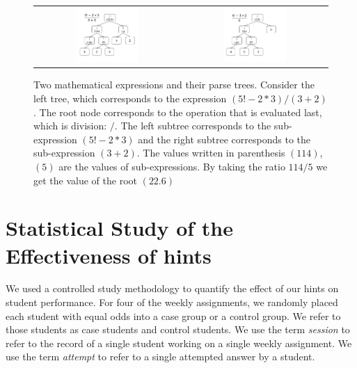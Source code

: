 \documentclass{llncs2e/llncs}
\begin{document}
\begin{figure}
  \centering
   \begin{tabular}{c c}
		\includegraphics[width=0.45\textwidth]{image/ParseTrees1.png} &
		\includegraphics[width=0.45\textwidth]{image/ParseTrees2.png}
	\end{tabular}
   \caption{Two mathematical expressions and their parse trees. Consider the left tree, which corresponds to the expression $(5!-2*3)/(3+2)$. The root node corresponds to the operation that is evaluated last, which is division: $/$. The left subtree corresponds to the sub-expression $(5!-2*3)$ and the right subtree corresponds to the sub-expression $(3+2)$. The values written in parenthesis $(114)$,$(5)$ are the values of sub-expressions. By taking the ratio $114/5$ we get the value of the root $(22.6)$}
   \label{fig:parse_tree}
\end{figure}

\section{Statistical Study of the Effectiveness of hints}

We used a controlled study methodology to quantify the effect of our
hints on student performance. For four of the weekly assignments, we
randomly placed each student with equal odds into a case group or a
control group. We refer to those students as case students and control
students.  We use the term {\em session} to refer to the record of a
single student working on a single weekly assignment. We use the term
{\em attempt} to refer to a single attempted answer by a student.
\end{document}
